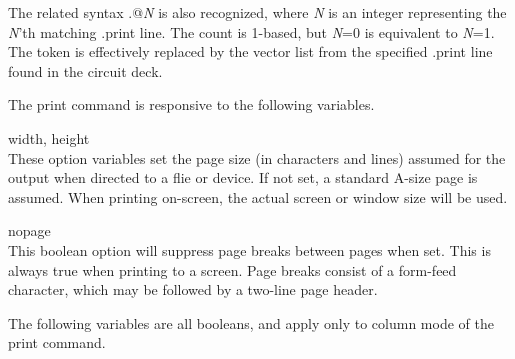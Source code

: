 The related syntax {\vt .@}{\it N} is also recognized, where {\it N}
is an integer representing the {\it N\/}'th matching {\vt .print} line. 
The count is 1-based, but {\it N\/}=0 is equivalent to {\it N\/}=1. 
The token is effectively replaced by the vector list from the
specified {\vt .print} line found in the circuit deck.

The print command is responsive to the following variables.

\begin{description}
\item{{\et width}, {\et height}}\\
These option variables set the page size (in characters and lines)
assumed for the output when directed to a flie or device.  If not set,
a standard A-size page is assumed.  When printing on-screen, the
actual screen or window size will be used.

\item{\et nopage}\\
This boolean option will suppress page breaks between pages when set. 
This is always true when printing to a screen.  Page breaks consist of
a form-feed character, which may be followed by a two-line page
header.
\end{description}

The following variables are all booleans, and apply only to column
mode of the {\cb print} command.

